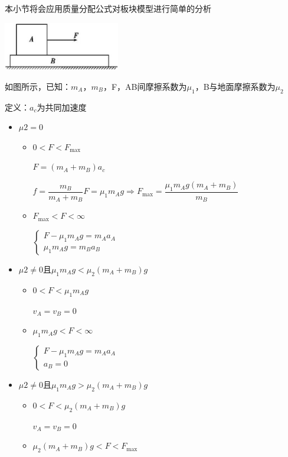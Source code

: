 \documentclass[cn,10.5pt,chinese,mac,chinesefont=founder]{elegantbook}
\begin{document}
\begin{problemset}
	本小节将会应用质量分配公式对板块模型进行简单的分析
\begin{center}
	\includegraphics[width=2in]{media/33.png}
\end{center}
	如图所示，已知：$m_A$，$m_B$，F，AB间摩擦系数为$\mu _1$，B与地面摩擦系数为$\mu _2$

	定义：$a_c$为共同加速度
	\begin{itemize}
		\item $\mu 2=0$
		\begin{itemize}
			\item $0<F<F_{\max }$
			
				$F=\left(m_{A}+m_{B}\right) a_{c} $

				$f=\dfrac{m_{B}}{m_{A}+m_{B}} F=\mu_{1} m_{A} g \Rightarrow F_{\max }=\dfrac{\mu_{1} m_{A} g\left(m_{A}+m_{B}\right)}{m_{B}}$
			\item $F_{\max }<F<\infty$
			
				$\left\{\begin{array}{c}F-\mu_{1} m_{A} g=m_{A} a_{A} \\ \mu_{1} m_{A} g=m_{B} a_{B}\end{array}\right.$
		\end{itemize}
		\item $\mu 2\neq 0$且$\mu_{1} m_{A} g<\mu_{2}\left(m_{A}+m_{B}\right) g$
		\begin{itemize}
			\item $0<F<\mu_{1} m_{A} g$
			
				$v_{A}=v_{B}=0$
			\item $\mu_{1} m_{A} g<F<\infty$
			
				$\left\{\begin{array}{c}F-\mu_{1} m_{A} g=m_{A} a_{A} \\ a_{B}=0\end{array}\right.$
		\end{itemize}
		\item $\mu 2\neq 0$且$\mu_{1} m_{A} g>\mu_{2}\left(m_{A}+m_{B}\right) g$
		\begin{itemize}
			\item $0<F<\mu_{2}\left(m_{A}+m_{B}\right) g$
				
				$v_{A}=v_{B}=0$
			\item $\mu_{2}\left(m_{A}+m_{B}\right) g<F<F_{\max }$
				

\end{itemize}
\end{itemize}
\end{problemset}
\end{document}
